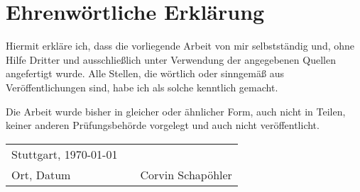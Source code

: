 \chapter{Ehrenwörtliche Erklärung}
\thispagestyle{front}
Hiermit erkläre ich, dass die vorliegende Arbeit von mir selbstständig und, ohne Hilfe Dritter und ausschließlich unter Verwendung der angegebenen Quellen angefertigt wurde. Alle Stellen, die wörtlich oder sinngemäß aus Veröffentlichungen sind, habe ich als solche kenntlich gemacht.

Die Arbeit wurde bisher in gleicher oder ähnlicher Form, auch nicht in Teilen, keiner anderen Prüfungsbehörde vorgelegt und auch nicht veröffentlicht.
\vspace{2cm}

\begin{center}
	\begin{tabular}[h]{lp{2cm}p{5.5cm}}
		Stuttgart, \today & & \\
		\cline{1-1}\cline{3-3}
		Ort, Datum& & Corvin Schapöhler\\
	\end{tabular}
\end{center}
